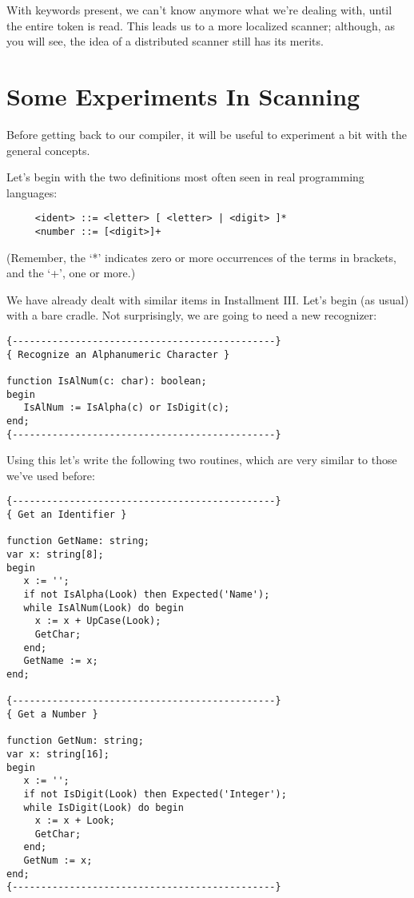 With keywords present, we  can't know anymore what we're dealing with, until the entire token is  read. This leads us to a more localized  scanner; although, as you will see, the  idea  of  a distributed scanner still has its merits.

\section{Some Experiments In Scanning}

Before  getting  back  to our compiler, it  will  be  useful  to experiment a bit with the general concepts.

Let's  begin with the two definitions most  often  seen  in  real programming languages:

\begin{verbatim}
     <ident> ::= <letter> [ <letter> | <digit> ]*
     <number ::= [<digit>]+
\end{verbatim}

(Remember, the `*' indicates zero or more occurrences of the terms in brackets, and the `+', one or more.)

We  have already dealt with similar  items  in  Installment  III. Let's begin (as usual) with a bare cradle. Not  surprisingly, we are going to need a new recognizer:

\begin{verbatim}
{----------------------------------------------}
{ Recognize an Alphanumeric Character }

function IsAlNum(c: char): boolean;
begin
   IsAlNum := IsAlpha(c) or IsDigit(c);
end;
{----------------------------------------------}
\end{verbatim}

Using this let's write the following two routines, which are very similar to those we've used before:

\begin{verbatim}
{----------------------------------------------}
{ Get an Identifier }

function GetName: string;
var x: string[8];
begin
   x := '';
   if not IsAlpha(Look) then Expected('Name');
   while IsAlNum(Look) do begin
     x := x + UpCase(Look);
     GetChar;
   end;
   GetName := x;
end;

{----------------------------------------------}
{ Get a Number }

function GetNum: string;
var x: string[16];
begin
   x := '';
   if not IsDigit(Look) then Expected('Integer');
   while IsDigit(Look) do begin
     x := x + Look;
     GetChar;
   end;
   GetNum := x;
end;
{----------------------------------------------}
\end{verbatim}

